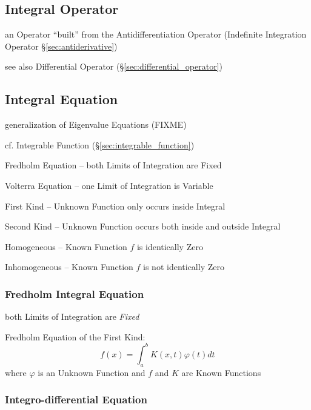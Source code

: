 \subsection{Integral Operator}\label{sec:integral_operator}

an Operator ``built'' from the Antidifferentiation Operator (Indefinite
Integration Operator \S\ref{sec:antiderivative})

\fist see also Differential Operator (\S\ref{sec:differential_operator})



\subsection{Integral Equation}\label{sec:integral_equation}

generalization of Eigenvalue Equations (FIXME)

cf. Integrable Function (\S\ref{sec:integrable_function})

Fredholm Equation -- both Limits of Integration are Fixed

Volterra Equation -- one Limit of Integration is Variable

First Kind -- Unknown Function only occurs inside Integral

Second Kind -- Unknown Function occurs both inside and outside Integral

Homogeneous -- Known Function $f$ is identically Zero

Inhomogeneous -- Known Function $f$ is not identically Zero



\subsubsection{Fredholm Integral Equation}\label{sec:fredholm_integral}

both Limits of Integration are \emph{Fixed}

Fredholm Equation of the First Kind:
\[
  f(x) = \int_a^b K(x,t) \varphi(t) dt
\]
where $\varphi$ is an Unknown Function and $f$ and $K$ are Known Functions



\subsubsection{Integro-differential Equation}\label{sec:integro_differential}



